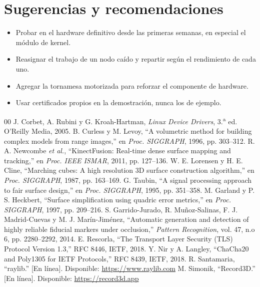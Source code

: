 \documentclass[journal]{IEEEtran}
\begin{document}
\section{Sugerencias y recomendaciones}
\begin{itemize}
  \item Probar en el hardware definitivo desde las primeras semanas, en especial
        el módulo de kernel.
  \item Reasignar el trabajo de un nodo caído y repartir según el rendimiento de
        cada uno.
  \item Agregar la tornamesa motorizada para reforzar el componente de hardware.
  \item Usar certificados propios en la demostración, nunca los de ejemplo.
\end{itemize}

\begin{thebibliography}{00}
 J. Corbet, A. Rubini y G. Kroah-Hartman, \emph{Linux Device
Drivers}, 3.\textsuperscript{a} ed. O'Reilly Media, 2005.
 B. Curless y M. Levoy, ``A volumetric method for building
complex models from range images,'' en \emph{Proc. SIGGRAPH}, 1996, pp. 303--312.
 R. A. Newcombe \emph{et al.}, ``KinectFusion: Real-time
dense surface mapping and tracking,'' en \emph{Proc. IEEE ISMAR}, 2011,
pp. 127--136.
 W. E. Lorensen y H. E. Cline, ``Marching cubes: A high
resolution 3D surface construction algorithm,'' en \emph{Proc. SIGGRAPH}, 1987,
pp. 163--169.
 G. Taubin, ``A signal processing approach to fair surface
design,'' en \emph{Proc. SIGGRAPH}, 1995, pp. 351--358.
 M. Garland y P. S. Heckbert, ``Surface simplification using
quadric error metrics,'' en \emph{Proc. SIGGRAPH}, 1997, pp. 209--216.
 S. Garrido-Jurado, R. Mu\~noz-Salinas, F. J. Madrid-Cuevas y
M. J. Mar\'in-Jim\'enez, ``Automatic generation and detection of highly reliable
fiducial markers under occlusion,'' \emph{Pattern Recognition}, vol. 47, n.o 6,
pp. 2280--2292, 2014.
 E. Rescorla, ``The Transport Layer Security (TLS) Protocol
Version 1.3,'' RFC 8446, IETF, 2018.
 Y. Nir y A. Langley, ``ChaCha20 and Poly1305 for IETF
Protocols,'' RFC 8439, IETF, 2018.
 R. Santamaria, ``raylib.'' [En línea]. Disponible:
\url{https://www.raylib.com}
 M. Simonik, ``Record3D.'' [En línea]. Disponible:
\url{https://record3d.app}
\end{thebibliography}
\end{document}
